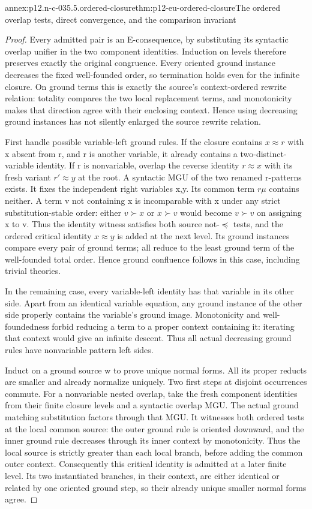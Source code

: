 \begin{annexitem}{annex:p12.n-c-035.5.ordered-closure}{thm:p12-eu-ordered-closure}{The ordered overlap tests, direct convergence, and the comparison invariant}
\begin{proof}
Every admitted pair is an E-consequence, by substituting its syntactic
overlap unifier in the two component identities. Induction on levels
therefore preserves exactly the original congruence. Every oriented
ground instance decreases the fixed well-founded order, so termination
holds even for the infinite closure.
On ground terms this is exactly the source's context-ordered rewrite
relation: totality compares the two local replacement terms, and
monotonicity makes that direction agree with their enclosing context.
Hence using decreasing ground instances has not silently enlarged
the source rewrite relation.

First handle possible variable-left ground rules. If the closure
contains \(x\approx r\) with x absent from r, and r is another
variable, it already contains a two-distinct-variable identity. If r
is nonvariable, overlap the reverse identity \(r\approx x\)
with its fresh variant \(r'\approx y\) at the root. A syntactic
MGU of the two renamed r-patterns exists. It fixes the independent
right variables x,y. Its common term \(r\mu\) contains neither.
A term v not containing x is incomparable with x under any strict
substitution-stable order: either \(v\succ x\) or \(x\succ v\)
would become \(v\succ v\) on assigning x to v. Thus the identity
witness satisfies both source not-\(\preceq\) tests, and the
ordered critical identity \(x\approx y\) is added at the next
level. Its ground instances compare every pair of ground terms;
all reduce to the least ground term of the well-founded total order.
Hence ground confluence follows in this case, including trivial theories.

In the remaining case, every variable-left identity has that variable
in its other side. Apart from an identical variable equation, any
ground instance of the other side properly contains the variable's
ground image. Monotonicity and well-foundedness forbid reducing a
term to a proper context containing it: iterating that context would
give an infinite descent. Thus all actual decreasing ground rules
have nonvariable pattern left sides.

Induct on a ground source w to prove unique normal forms. All its
proper reducts are smaller and already normalize uniquely. Two first
steps at disjoint occurrences commute. For a nonvariable nested
overlap, take the fresh component identities from their finite
closure levels and a syntactic overlap MGU. The actual ground
matching substitution factors through that MGU. It witnesses both
ordered tests at the local common source: the outer ground rule is
oriented downward, and the inner ground rule decreases through its
inner context by monotonicity. Thus the local source is strictly
greater than each local branch, before adding the common outer context.
Consequently this critical identity is admitted at a later finite
level. Its two instantiated branches, in their context, are either
identical or related by one oriented ground step, so their already
unique smaller normal forms agree.


\end{proof}
\end{annexitem}
